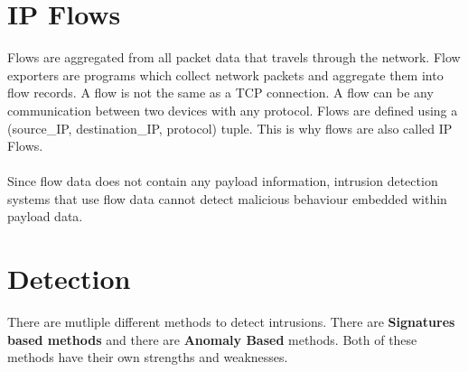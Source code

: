 \section{IP Flows}
\label{export}
Flows are aggregated from all packet data that travels through the network. Flow exporters are programs which collect network packets and aggregate them into flow records. A flow is not the same as a TCP connection. A flow can be any communication between two devices with any protocol. Flows are defined using a (source\_IP, destination\_IP, protocol) tuple. This is why flows are also called IP Flows.\\
\\
Since flow data does not contain any payload information, intrusion detection systems that use flow data cannot detect malicious behaviour embedded within payload data. \cite{IPFlow}

\section{Detection}
There are mutliple different methods to detect intrusions. There are \textbf{Signatures based methods} and there are \textbf{Anomaly Based} methods. Both of these methods have their own strengths and weaknesses. \cite{methods}
